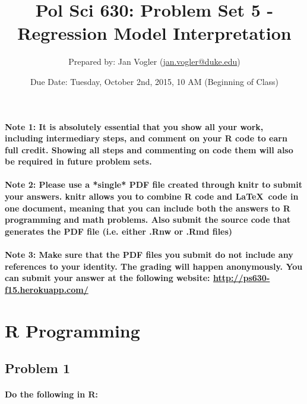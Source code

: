 \documentclass[12pt,letter]{article}
\begin{document}
\title{Pol Sci 630: Problem Set 5 - Regression Model Interpretation}

\author{Prepared by: Jan Vogler (\href{mailto:jan.vogler@duke.edu}{jan.vogler@duke.edu})}

\date{Due Date: Tuesday, October 2nd, 2015, 10 AM (Beginning of Class)}
 
\maketitle 



\paragraph{Note 1: It is absolutely essential that you show all your work, including intermediary steps, and comment on your R code to earn full credit. Showing all steps and commenting on code them will also be required in future problem sets.}

\paragraph{Note 2: Please use a *single* PDF file created through knitr to submit your answers. knitr allows you to combine R code and \LaTeX \ code in one document, meaning that you can include both the answers to R programming and math problems. Also submit the source code that generates the PDF file (i.e. either .Rnw or .Rmd files)}

\paragraph{Note 3: Make sure that the PDF files you submit do not include any references to your identity. The grading will happen anonymously. You can submit your answer at the following website: \url{http://ps630-f15.herokuapp.com/}}



\section*{R Programming}

\subsection*{Problem 1}

\paragraph{Do the following in R:}
\end{document}
